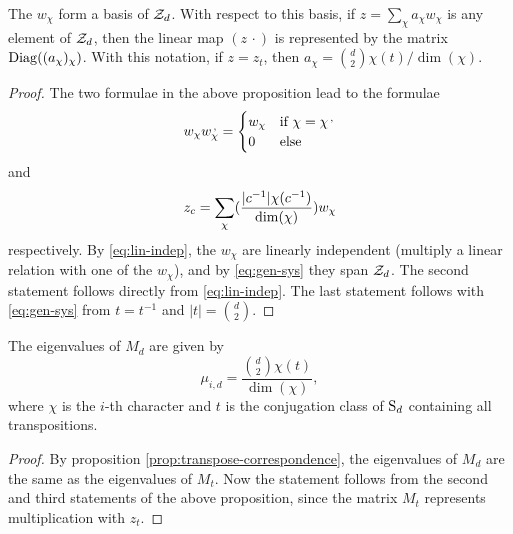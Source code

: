 \begin{prop} \label{prop:simultaneous-eigenvectors}
 The $w_\chi$ form a basis of $\mathcal{Z}_d$. With respect to this basis, if $z=\sum_\chi a_\chi w_\chi$ is any element of $\mathcal{Z}_d$, then the linear map $(z\,\cdot)$ is represented by the matrix $\operatorname{Diag}((a_\chi)_\chi)$. With this notation, if $z=z_t$, then $a_\chi=\binom{d}{2} \chi({t})/\dim({\chi})$. 
\end{prop}
\begin{proof}
 The two formulae in the above proposition lead to the formulae
 \begin{equation} \label{eq:lin-indep}
  w_\chi w_\chi^\textrm{\,,} =
  \begin{cases} w_\chi &\mbox{if } \chi = \chi^\textrm{\,,} \\
                     0 &\mbox{else}
  \end{cases}
 \end{equation}
 and
 \begin{equation} \label{eq:gen-sys}
  z_c=\sum_{\chi}(\frac{|c^{-1}|\chi(c^{-1})}{\dim(\chi)})w_\chi
 \end{equation}
 respectively.
 By \eqref{eq:lin-indep}, the $w_\chi$ are linearly independent (multiply a linear relation with one of the $w_\chi$), and by \eqref{eq:gen-sys} they span $\mathcal{Z}_d$.
 The second statement follows directly from \eqref{eq:lin-indep}. The last statement follows with \eqref{eq:gen-sys} from $t=t^{-1}$ and $|t|=\binom{d}{2}$.
\end{proof}

\begin{lemma}
 The eigenvalues of $M_d$ are given by \[\mu_{i,d}=\frac{\binom{d}{2} \chi(t)}{\dim(\chi)},\] where $\chi$ is the $i$-th character and $t$ is the conjugation class of $\operatorname{S}_d$ containing all transpositions.
\end{lemma}
\begin{proof}
 By proposition \ref{prop:transpose-correspondence}, the eigenvalues of $M_d$ are the same as the eigenvalues of $M_t$. Now the statement follows from the second and third statements of the above proposition, since the matrix $M_t$ represents multiplication with $z_t$.
\end{proof}